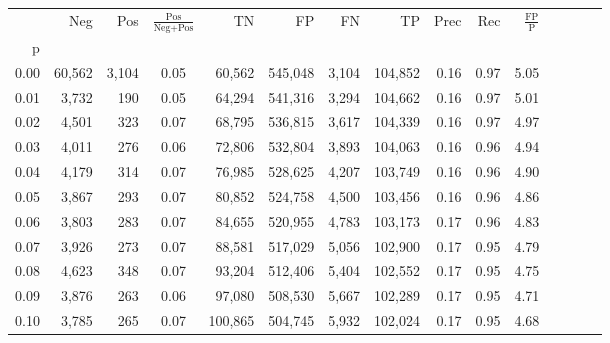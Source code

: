 \begin{tabular}{rrrcrrrrrrrrrrr}
\toprule
{} &     Neg &     Pos & $\frac{\text{Pos}}{\text{Neg}+\text{Pos}}$ &       TN &       FP &       FN &       TP &  Prec &   Rec & $\frac{\text{FP}}{\text{P}}$ \\
p    &         &         &                                            &          &          &          &          &       &       &                              \\
\midrule
0.00 &  60,562 &   3,104 &                                       0.05 &   60,562 &  545,048 &    3,104 &  104,852 &  0.16 &  0.97 &                         5.05 \\
0.01 &   3,732 &     190 &                                       0.05 &   64,294 &  541,316 &    3,294 &  104,662 &  0.16 &  0.97 &                         5.01 \\
0.02 &   4,501 &     323 &                                       0.07 &   68,795 &  536,815 &    3,617 &  104,339 &  0.16 &  0.97 &                         4.97 \\
0.03 &   4,011 &     276 &                                       0.06 &   72,806 &  532,804 &    3,893 &  104,063 &  0.16 &  0.96 &                         4.94 \\
0.04 &   4,179 &     314 &                                       0.07 &   76,985 &  528,625 &    4,207 &  103,749 &  0.16 &  0.96 &                         4.90 \\
0.05 &   3,867 &     293 &                                       0.07 &   80,852 &  524,758 &    4,500 &  103,456 &  0.16 &  0.96 &                         4.86 \\
0.06 &   3,803 &     283 &                                       0.07 &   84,655 &  520,955 &    4,783 &  103,173 &  0.17 &  0.96 &                         4.83 \\
0.07 &   3,926 &     273 &                                       0.07 &   88,581 &  517,029 &    5,056 &  102,900 &  0.17 &  0.95 &                         4.79 \\
0.08 &   4,623 &     348 &                                       0.07 &   93,204 &  512,406 &    5,404 &  102,552 &  0.17 &  0.95 &                         4.75 \\
0.09 &   3,876 &     263 &                                       0.06 &   97,080 &  508,530 &    5,667 &  102,289 &  0.17 &  0.95 &                         4.71 \\
0.10 &   3,785 &     265 &                                       0.07 &  100,865 &  504,745 &    5,932 &  102,024 &  0.17 &  0.95 &                         4.68 \\

\end{tabular}
